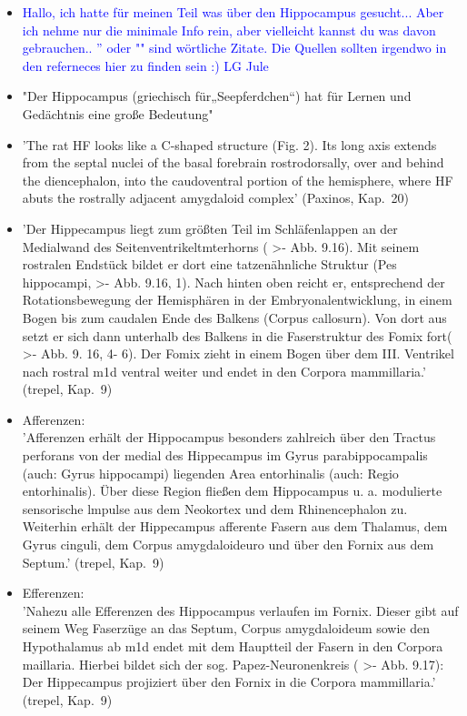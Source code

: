 \documentclass[12pt,a4paper,pdftex]{article}
\begin{document}
\begin{itemize}

\item \textcolor{blue}{Hallo, ich hatte für meinen Teil was über den Hippocampus gesucht... Aber ich nehme nur die minimale Info rein, aber vielleicht kannst du was davon gebrauchen.. '' oder "" sind wörtliche Zitate. Die Quellen sollten irgendwo in den referneces hier zu finden sein :) LG Jule}

\item "Der Hippocampus (griechisch für„Seepferdchen“) hat für Lernen und Gedächtnis eine große Bedeutung" \cite[Kap.~7]{neurowissenschaften_baer}
	
\item 'The rat HF looks like a C-shaped structure (Fig. 2). Its long axis extends from the septal nuclei of the basal forebrain rostrodorsally, over and behind the diencephalon, into the caudoventral portion of the hemisphere, where HF abuts the rostrally adjacent amygdaloid complex' (Paxinos, Kap.~20)

\item 'Der Hippecampus liegt zum größten Teil im Schläfenlappen an der Medialwand des Seitenventrikeltmterhorns ( >- Abb. 9.16). Mit seinem rostralen Endstück bildet er dort eine tatzenähnliche Struktur (Pes hippocampi, >- Abb. 9.16, 1). Nach hinten oben reicht er, entsprechend der Rotationsbewegung der Hemisphären in der Embryonalentwicklung, in einem Bogen bis zum caudalen Ende des Balkens (Corpus callosurn). Von dort aus setzt er sich dann unterhalb des Balkens in die Faserstruktur
des Fomix fort( >- Abb. 9. 16, 4- 6). Der Fomix zieht in
einem Bogen über dem III. Ventrikel nach rostral m1d ventral weiter und endet in den Corpora mammillaria.' (trepel, Kap.~9)

\item Afferenzen:\\
'Afferenzen erhält der Hippocampus besonders zahlreich über den Tractus perforans von der medial des Hippecampus im Gyrus parabippocampalis (auch: Gyrus hippocampi) liegenden Area entorhinalis (auch: Regio entorhinalis). Über diese Region fließen dem Hippocampus u. a. modulierte sensorische lmpulse aus dem Neokortex und dem Rhinencephalon zu. Weiterhin erhält der Hippecampus afferente Fasern aus dem Thalamus, dem Gyrus cinguli, dem Corpus amygdaloideuro und über den Fornix aus dem Septum.' (trepel, Kap.~9)

\item Efferenzen:\\
'Nahezu alle Efferenzen des Hippocampus verlaufen im Fornix. Dieser gibt auf seinem Weg Faserzüge an das Septum, Corpus amygdaloideum sowie den Hypothalamus ab m1d endet mit dem Hauptteil der Fasern in den Corpora maillaria. Hierbei bildet sich der sog. Papez-Neuronenkreis ( >- Abb. 9.17): Der Hippecampus projiziert über den Fornix in die Corpora mammillaria.' (trepel, Kap.~9)


\end{itemize}
\end{document}
